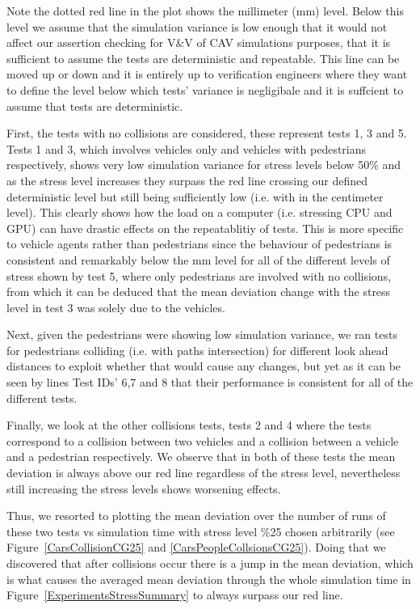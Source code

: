 Note the dotted red line in the plot shows the millimeter (mm) level. 
Below this level we assume that the simulation variance is low enough that it would not affect our assertion checking for V\&V of CAV simulations purposes, that it is sufficient to assume the tests are deterministic and repeatable. 
This line can be moved up or down and it is entirely up to verification engineers where they want to define the level below which tests' variance is negligibale and it is suffcient to assume that tests are deterministic.


First, the tests with no collisions are considered, these represent tests 1, 3 and 5.
Tests 1 and 3, which involves vehicles only and vehicles with pedestrians respectively, shows very low simulation variance for stress levels below 50\% and as the stress level increases they surpass the red line crossing our defined deterministic level but still being sufficiently low (i.e. with in the centimeter level). This clearly shows how the load on a computer (i.e. stressing CPU and GPU) can have drastic effects on the repeatablitiy of tests.
This is more specific to vehicle agents rather than pedestrians since the behaviour of pedestrians is consistent and remarkably below the mm level for all of the different levels of stress shown by test 5, where only pedestrians are involved with no collisions, from which it can be deduced that the mean deviation change with the stress level in test 3 was solely due to the vehicles.

Next, given the pedestrians were showing low simulation variance, we ran tests for pedestrians colliding (i.e. with paths intersection) for different look ahead distances to exploit whether that would cause any changes, but yet as it can be seen by lines Test IDs' 6,7 and 8 that their performance is consistent for all of the different tests.

Finally, we look at the other collisions tests, tests 2 and 4 where the tests correspond to a collision between two vehicles and a collision between a vehicle and a pedestrian respectively. 
We observe that in both of these tests the mean deviation is always above our red line regardless of the stress level, nevertheless still increasing the stress levels shows worsening effects.

Thus, we resorted to plotting the mean deviation over the number of runs of these two tests vs simulation time with stress level \%25 chosen arbitrarily (see Figure~\ref{CarsCollisionCG25} and \ref{CarsPeopleCollsionsCG25}). 
Doing that we discovered that after collisions occur there is a jump in the mean deviation, which is what causes the averaged mean deviation through the whole simulation time in Figure~\ref{ExperimentsStressSummary} to always surpass our red line.

